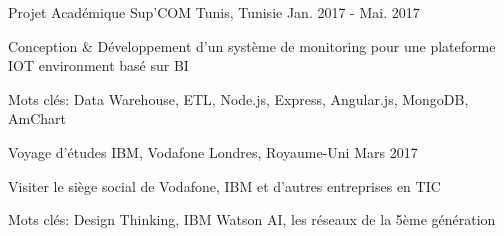 \begin{cventries}
  \cventry
    {Projet Académique} %
    {Sup'COM} %
    {Tunis, Tunisie} %
    {Jan. 2017 - Mai. 2017} %
    {
      \begin{cvitems} %
        \item {Conception \& Développement d'un système de monitoring pour une plateforme IOT environment basé sur BI }
        \item {Mots clés: Data Warehouse, ETL, Node.js, Express, Angular.js, MongoDB, AmChart}
      \end{cvitems}
    }

  \cventry
    {Voyage d'études} %
    {IBM, Vodafone } %
    {Londres, Royaume-Uni} %
    {Mars 2017 } %
    {
      \begin{cvitems} %
        \item {Visiter le siège social de Vodafone, IBM et d'autres entreprises en TIC
}
        \item {Mots clés: Design Thinking, IBM Watson AI, les réseaux de la 5ème génération }
      \end{cvitems}
    }

\end{cventries}
